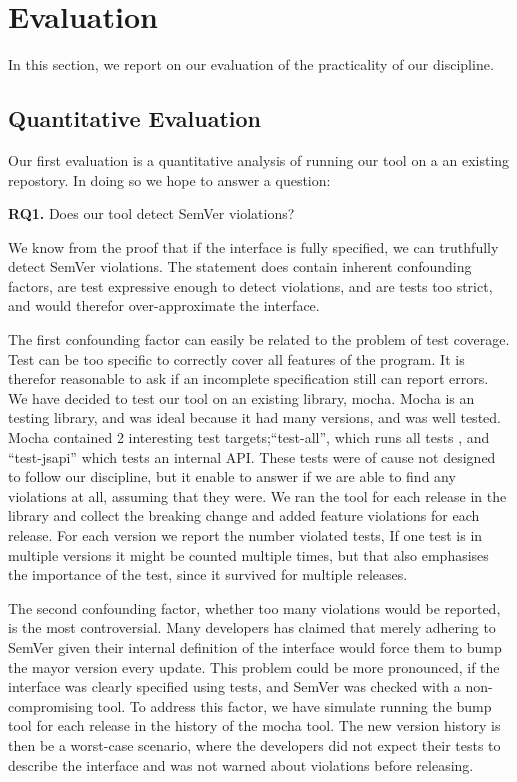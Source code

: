 \section{Evaluation}


In this section, we report on our evaluation of the practicality of
our discipline. 

\subsection{Quantitative Evaluation}

Our first evaluation is a quantitative analysis of running our tool on a
an existing repostory. In doing so we hope to answer a question:

{\bf RQ1.} Does our tool detect SemVer violations?

We know from the proof that if the interface is fully specified, we can
truthfully detect SemVer violations. The statement does contain 
inherent confounding factors, are test expressive enough to detect
violations, and are tests too strict, and would therefor over-approximate 
the interface.

The first confounding factor can easily be related to the problem of
test coverage. Test can be too specific to correctly cover all features
of the program. It is therefor reasonable to ask if an incomplete
specification still can report errors. We have decided to test our tool
on an existing library, mocha\cite{mocha}. Mocha is an testing library,
and was ideal because it had many versions, and was well tested. Mocha
contained 2 interesting test targets;``test-all'', which runs all tests
, and ``test-jsapi'' which tests an internal API\@. These tests were of
cause not designed to follow our discipline, but it enable to answer if
we are able to find any violations at all, assuming that they were. We
ran the tool for each release in the library and collect the breaking
change and added feature violations for each release. For each version
we report the number violated tests, If one test is in multiple versions
it might be counted multiple times, but that also emphasises the
importance of the test, since it survived for multiple releases.

The second confounding factor, whether too many violations would be
reported, is the most controversial. Many developers has claimed that
merely adhering to SemVer given their internal definition of the
interface would force them to bump the mayor version every
update\cite{backbone-2888,exoplayer-1382,crawford-not-semver}. This problem could be
more pronounced, if the interface was clearly specified using tests, and
SemVer was checked with a non-compromising tool. To address this factor,
we have simulate running the bump tool for each release in the history
of the mocha tool. The new version history is then be a worst-case
scenario, where the developers did not expect their tests to describe
the interface and was not warned about violations before releasing.

